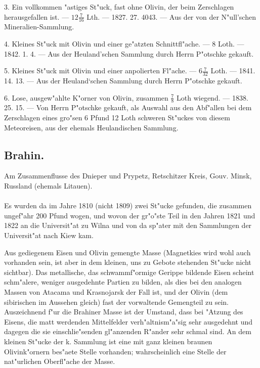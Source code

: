 \documentclass[a4paper, 11pt, oneside, polutonikogreek, german]{article}
\begin{document}
3. Ein vollkommen "astiges St"uck, fast ohne Olivin, der beim Zerschlagen herausgefallen ist. --- $12\frac{7}{16}$ Lth. --- 1827. 27. 4043. --- Aus der von der N"ull'schen Mineralien-Sammlung.

4. Kleines St"uck mit Olivin und einer ge"atzten Schnittfl"ache. --- 8 Loth. --- 1842. 1. 4. --- Aus der Heuland'schen Sammlung durch Herrn P"otschke gekauft.

5. Kleines St"uck mit Olivin und einer anpolierten Fl"ache. --- $6\frac{7}{32}$ Loth. --- 1841. 14. 13. --- Aus der Heuland‘schen Sammlung durch Herrn P"otschke gekauft.

6. Lose, ausgew"ahlte K"orner von Olivin, zusammen $\frac{7}{8}$ Loth wiegend. --- 1838. 25. 15. --- Von Herrn P"otschke gekauft, als Auswahl aus den Abf"allen bei dem Zerschlagen eines gro"sen 6 Pfund 12 Loth schweren St"uckes von diesem Meteoreisen, aus der ehemals Heulandischen Sammlung.
\subsection{Brahin.}
\begin{center}
\small
Am Zusammenflusse des Dnieper und Prypetz, Retschitzer Kreis, Gouv. Minsk, Russland (ehemals Litauen).
\end{center}
\paragraph{}
Es wurden da im Jahre 1810 (nicht 1809) zwei St"ucke gefunden, die zusammen ungef"ahr 200 Pfund wogen, und wovon der gr"o"ste Teil in den Jahren 1821 und 1822 an die Universit"at zu Wilna und von da sp"ater mit den Sammlungen der Universit"at nach Kiew kam.

Aus gediegenem Eisen und Olivin gemengte Masse (Magnetkies wird wohl auch vorhanden sein, ist aber in dem kleinen, uns zu Gebote stehenden St"ucke nicht sichtbar). Das metallische, das schwammf"ormige Gerippe bildende Eisen scheint schm"alere, weniger ausgedehnte Partien zu bilden, als dies bei den analogen Massen von Atacama und Krasnojarsk der Fall ist, und der Olivin (dem sibirischen im Aussehen gleich) fast der vorwaltende Gemengteil zu sein. Auszeichnend f"ur die Brahiner Masse ist der Umstand, dass bei "Atzung des Eisens, die matt werdenden Mittelfelder verh"altnism"a"sig sehr ausgedehnt und dagegen die sie einschlie"senden gl"anzenden R"ander sehr schmal sind. An dem kleinen St"ucke der k. Sammlung ist eine mit ganz kleinen braunen Olivink"ornern bes"aete Stelle vorhanden; wahrscheinlich eine Stelle der nat"urlichen Oberfl"ache der Masse.
\end{document}
